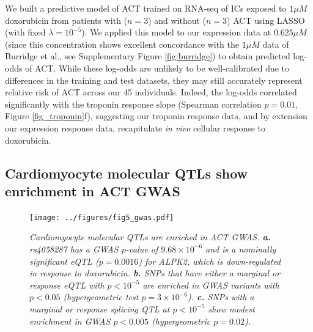 \documentclass{article}
\begin{document}
{We built a predictive model of ACT trained on RNA-seq of ICs exposed to $1 \mu M$ doxorubicin from patients with ($n=3$) and without ($n=3$) ACT\cite{Burridge2016} using LASSO (with fixed $\lambda=10^{-5}$). We applied this model to our expression data at $0.625 \mu M$ (since this concentration shows excellent concordance with the $1 \mu M$ data of Burridge et al., see Supplementary Figure \ref{fig:burridge}) to obtain predicted log-odds of ACT. While these log-odds are unlikely to be well-calibrated due to differences in the training and test datasets, they may still accurately represent relative risk of ACT across our 45 individuals. Indeed, the log-odds correlated significantly with the troponin response slope (Spearman correlation $p=0.01$, Figure \ref{fig_troponin}f), suggesting our troponin response data, and by extension our expression response data, recapitulate \emph{in vivo} cellular response to doxorubicin. 

\subsection*{Cardiomyocyte molecular QTLs show enrichment in ACT GWAS} 

\begin{figure}
\begin{center}
    \texttt{[image: ../figures/fig5\_gwas.pdf]}     \caption{\it{Cardiomyocyte molecular QTLs are enriched in ACT GWAS. \textbf{a.} rs4058287 has a GWAS $p$-value of $9.68\times 10^{-6}$ and is a nominally significant eQTL ($p=0.0016$) for ALPK2, which is down-regulated in response to doxorubicin. \textbf{b.} SNPs that have either a marginal or response eQTL with $p<10^{-5}$ are enriched in GWAS variants with $p<0.05$ (hypergeometric test $p=3 \times 10^{-6}$). \textbf{c.} SNPs with a marginal or response splicing QTL at $p<10^{-5}$ show modest enrichment in GWAS $p<0.005$ (hypergeometric $p=0.02$).}}
    \label{fig:gwas}
    \end{center}
\end{figure}


}
\end{document}
